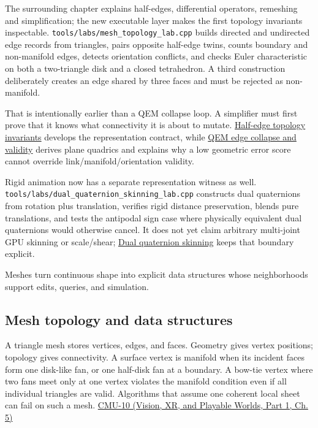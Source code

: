 The surrounding chapter explains half-edges, differential operators, remeshing and simplification; the new executable layer makes the first topology invariants inspectable. \texttt{tools/labs/mesh\_topology\_lab.cpp} builds directed and undirected edge records from triangles, pairs opposite half-edge twins, counts boundary and non-manifold edges, detects orientation conflicts, and checks Euler characteristic on both a two-triangle disk and a closed tetrahedron. A third construction deliberately creates an edge shared by three faces and must be rejected as non-manifold.

That is intentionally earlier than a QEM collapse loop. A simplifier must first prove that it knows what connectivity it is about to mutate. \hyperref[appendix-faac749c9cdd]{Half-edge topology invariants} develops the representation contract, while \hyperref[appendix-89db9fe1bc8a]{QEM edge collapse and validity} derives plane quadrics and explains why a low geometric error score cannot override link/manifold/orientation validity.

Rigid animation now has a separate representation witness as well. \texttt{tools/labs/dual\_quaternion\_skinning\_lab.cpp} constructs dual quaternions from rotation plus translation, verifies rigid distance preservation, blends pure translations, and tests the antipodal sign case where physically equivalent dual quaternions would otherwise cancel. It does not yet claim arbitrary multi-joint GPU skinning or scale/shear; \hyperref[appendix-921f3f2efb53]{Dual quaternion skinning} keeps that boundary explicit.

Meshes turn continuous shape into explicit data structures whose neighborhoods support edits, queries, and simulation.

\subsection{Mesh topology and data structures}\label{03-visual-computing-i-ch002-mesh-topology-and-data-structures}

\hypertarget{03-visual-computing-i-ch002-mesh-topology-and-data-structures}{}

A triangle mesh stores vertices, edges, and faces. Geometry gives vertex positions; topology gives connectivity. A surface vertex is manifold when its incident faces form one disk-like fan, or one half-disk fan at a boundary. A bow-tie vertex where two fans meet only at one vertex violates the manifold condition even if all individual triangles are valid. Algorithms that assume one coherent local sheet can fail on such a mesh. \href{../07-Vision-XR-and-Playable-Worlds-P01/main.pdf\#nameddest=04-visual-computing-ii-ch036-cmu-10---meshes-and-manifolds}{CMU-10 (Vision, XR, and Playable Worlds, Part 1, Ch. 5)}

